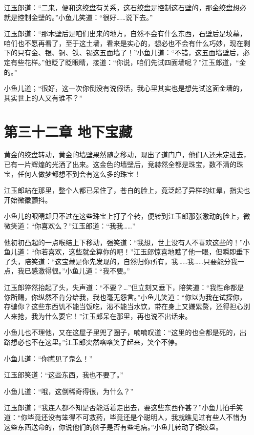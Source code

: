 \documentclass[12pt,oneside]{book}
\begin{document}
江玉郎道：``二来，便和这绞盘有关系，这石绞盘是控制这石壁的，那金绞盘想必就是控制金壁的。''小鱼儿笑道：``很好\ldots\ldots 说下去。''

江玉郎道：``那木壁后是咱们出来的地方，自然不会有什么东西，石壁后是坟墓，咱们也不愿再看了，至于这土墙，看来是实心的，想必也不会有什么巧妙，现在剩下的只有金、银、铜、铁、锡这五面墙了！''小鱼儿道：``不错，这五面墙壁后，必定有些花样。''他眨了眨眼睛，接道：``你说，咱们先试四面墙呢？''江玉郎道，``金的。''

小鱼儿道；``很好，这一次你倒没有说假话，我心里其实也是想先试这面金墙的，其实世上的人又有谁不？''

\hypertarget{ux7b2cux4e09ux5341ux4e8cux7ae0-ux5730ux4e0bux5b9dux85cf}{%
\chapter{第三十二章
地下宝藏}\label{ux7b2cux4e09ux5341ux4e8cux7ae0-ux5730ux4e0bux5b9dux85cf}}

黄金的绞盘转动，黄金的墙壁果然随之移动，现出了道门户，他们人还未定进去，已有一片辉煌的光洒了出来。这金色的墙壁后，竞赫然全都是珠宝，数不清的珠宝，任何人做梦都想不到会有这么多的珠宝！

江玉郎站在那里，整个人都已呆住了，苍白的脸上，竟泛起了异样的红晕，指尖也开始微徽颤抖。

小鱼儿的眼睛却只不过在这些珠宝上打了个转，便转到江玉郎那张激动的脸上，微微笑道：``你喜欢么？''江玉郎道：``我我\ldots\ldots{}''

他初初凸起的一点喉结上下移动，强笑道：``我想，世上没有人不喜欢这些的！''小鱼儿道：``你若喜欢，这些就全算你的吧！''江玉郎惊喜地瞧了他一眼，但瞬即垂下了头，陪笑道：``这宝藏是你先发现的，自然归你所有，我\ldots\ldots 我\ldots\ldots 只要能分我一点，我已感激得很。''小鱼儿道：``我不要。''

江玉郎猝然抬起了头，失声道：``不要？\ldots{}''但立刻又垂下，陪笑道：``我性命都是你所赐，你纵然不肯分给我，我也毫无怨言。''小鱼儿笑道：``你以为我在试探你，存骗你？这些东西饥不能当饭吃，渴不能当水饮，带在身上又嫌累赘，还得担心别人来抢，我为什么要它！''江玉郎呆在那里，再也说不出话来。

小鱼儿也不理他，又在这屋子里兜了圈子，喃喃叹道：``这里的也全都是死的，出路想必也不在这里。''江玉郎突然咯咯笑了起来，笑个不停。

小鱼儿道：``你瞧见了鬼么！''

江玉郎笑道：``这些东西，我也不要了。''

小鱼儿道：``哦，这倒稀奇得很，为什么？''

江玉郎道；``我连人都不知是否能活着走出去，要这些东西作甚？''小鱼儿拍手笑道：``你毕竟还没有笨得不可救药，毕竟还是个聪明人，我就瞧见过有些人不惜为这些东西送命的，你说他们的脑子是否有些毛病。''小鱼儿转动了铜绞盘。
\end{document}
